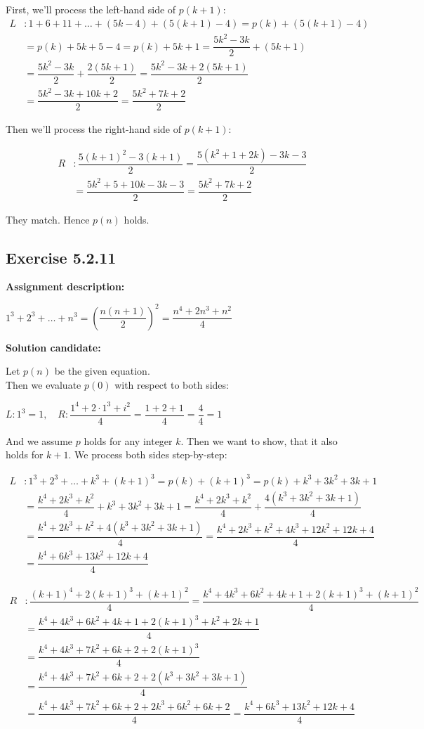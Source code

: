 \documentclass{report}
\newcommand{\cent}[1]{\begin{center}#1\end{center}}
\newcommand{\mAlign}[1]{\begin{align*}#1\end{align*}}
\newcommand{\assignmentDescription}{\textbf{Assignment description: }}
\newcommand{\solution}{\textbf{Solution candidate: }}
\newcommand{\QED}{\boxed{}}
\newcommand{\Exercise}[1]{\subsection{Exercise #1}}
\newcommand{\parenthesis}[1]{\left( #1 \right)}
\begin{document}
 	First, we'll process the left-hand side of $p(k+1)$:
 	\mAlign{
 		L &:  1 + 6 + 11 + \dots + (5k-4) + (5(k+1)-4) = p(k) + (5(k+1)-4) \\
 		&= p(k) + 5k+5-4 = p(k) + 5k+1 =  \dfrac{5k^2-3k}{2} + (5k+1) \\
 		&= \dfrac{5k^2-3k}{2} + \dfrac{2(5k+1)}{2} = \dfrac{5k^2-3k + 2(5k+1)}{2} \\
 		&= \dfrac{5k^2-3k + 10k+2}{2} = \dfrac{5k^2+ 7k+2}{2}
 	}
 	
 	Then we'll process the right-hand side of $p(k+1)$:
 	
 	\mAlign{
 		R &:  \dfrac{5(k+1)^2-3(k+1)}{2} = \dfrac{5(k^2+1+2k)-3k-3}{2}\\
 		&= \dfrac{5k^2+5+10k-3k-3}{2} = \dfrac{5k^2+7k+2}{2}
 	}
 	
 	They match. Hence $p(n)$ holds.\\
 	
 	\QED
 
 	
 	\Exercise{5.2.11}
 	
 	\assignmentDescription
 	\cent{$1^3+2^3 + \dots + n^3 = \parenthesis{\dfrac{n(n+1)}{2}}^2 =  \dfrac{n^4+2n^3+n^2}{4}$}
 	\solution
 	
 	Let $p(n)$ be the given equation.\\
 	
 	Then we evaluate $p(0)$ with respect to both sides:
 	
 	$L : 1^3 = 1, \quad R : \dfrac{1^4+2 \cdot 1^3 + i^2}{4} = \dfrac{1+2+1}{4} = \dfrac{4}{4} = 1$
 	
 	And we assume $p$ holds for any integer $k$. Then we want to show, that it also holds for $k+1$. We process both sides step-by-step:
 	
 	\mAlign{
 		L &: 1^3+2^3 + \dots + k^3 + (k+1)^3 = p(k) + (k+1)^3 = p(k) + k^3+3k^2 + 3k+1 \\
 		&= \dfrac{k^4+2k^3+k^2}{4} + k^3+3k^2 + 3k+1 = \dfrac{k^4+2k^3+k^2}{4} + \dfrac{4(k^3+3k^2 + 3k+1)}{4} \\
 		&= \dfrac{k^4+2k^3+k^2 + 4(k^3+3k^2 + 3k+1)}{4} = \dfrac{k^4+2k^3+k^2 + 4k^3 + 12k^2+12k+4}{4} \\
 		&= \dfrac{k^4+6k^3 + 13k^2+12k+4}{4}
 	}
 	
 	\mAlign{
 		R &: \dfrac{(k+1)^4+2(k+1)^3+(k+1)^2}{4} = \dfrac{k^4 +4 k^3 + 6k^2+ 4k + 1+2(k+1)^3+(k+1)^2}{4} \\
 		&= \dfrac{k^4 +4 k^3 + 6k^2+ 4k + 1+2(k+1)^3+k^2+2k+1}{4} \\
 		&= \dfrac{k^4 +4 k^3 + 7k^2+ 6k + 2+2(k+1)^3}{4} \\
 		&= \dfrac{k^4 +4 k^3 + 7k^2+ 6k + 2+ 2 (k^3+3k^2 + 3k + 1)}{4} \\
 		&= \dfrac{k^4 +4 k^3 + 7k^2+ 6k + 2 + 2k^3 +6k^2+6k+2}{4} = \dfrac{k^4 +6 k^3 + 13k^2+ 12k + 4}{4}
 	}
 
\end{document}
